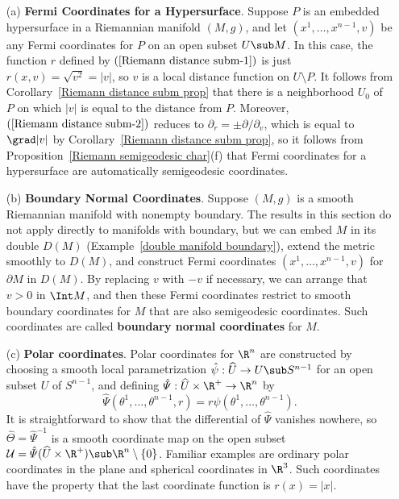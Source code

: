 \begin{example}
\mbox{}
\begin{itemize}
\item[(a)] \textbf{Fermi Coordinates for a Hypersurface}. Suppose $P$ is an embedded hypersurface in a Riemannian manifold $(M,g)$, and let $(x^1,\dots,x^{n-1},v)$ be 
any Fermi coordinates for $P$ on an open subset $U\sub M$. In this case, the function $r$ defined by $(\ref{Riemann distance subm-1})$ is just $r(x,v)=\sqrt{v^2}=|v|$, so 
$v$ is a local distance function on $U\setminus P$. It follows from Corollary~\ref{Riemann distance subm prop} that there is a neighborhood $U_0$ of $P$ on which $|v|$ 
is equal to the distance from $P$. Moreover, $(\ref{Riemann distance subm-2})$ reduces to $\partial_r=\pm\partial/\partial_v$, which is equal to $\grad |v|$ by 
Corollary~\ref{Riemann distance subm prop}, so it follows from Proposition~\ref{Riemann semigeodesic char}(f) that Fermi coordinates for a hypersurface are 
automatically semigeodesic coordinates.
\item[(b)] \textbf{Boundary Normal Coordinates}. Suppose $(M,g)$ is a smooth Riemannian manifold with nonempty boundary. The results in this section do not apply 
directly to manifolds with boundary, but we can embed $M$ in its double $D(M)$ (Example~\ref{double manifold boundary}), extend the metric smoothly to $D(M)$, 
and construct Fermi coordinates $(x^1,\dots,x^{n-1},v)$ for $\partial M$ in $D(M)$. By replacing $v$ with $-v$ if necessary, we can arrange that $v>0$ in $\Int M$, 
and then these Fermi coordinates restrict to smooth boundary coordinates for $M$ that are also semigeodesic coordinates. Such coordinates are called 
\textbf{boundary normal coordinates} for $M$.
\item[(c)] \textbf{Polar coordinates}. Polar coordinates for $\R^n$ are constructed by choosing a smooth local parametrization $\hat{\psi}:\widehat{U}\to U\sub S^{n-1}$ for an open subset $U$ of $S^{n-1}$, and defining $\hat{\varPsi}:\widehat{U}\times\R^+\to\R^n$ by 
\[\hat{\varPsi}(\theta^1,\dots,\theta^{n-1},r)=r\widehat{\psi}(\theta^1,\dots,\theta^{n-1}).\]
It is straightforward to show that the differential of $\hat{\varPsi}$ vanishes nowhere, so $\hat{\varTheta}=\hat{\varPsi}^{-1}$ is a smooth coordinate map on the open subset $\mathcal{U}=\hat{\varPsi}(\widehat{U}\times\R^+)\sub\R^n\setminus\{0\}$. Familiar examples are ordinary polar coordinates in the plane and spherical coordinates in $\R^3$. Such coordinates have the property that the last coordinate function is $r(x)=|x|$.

\end{itemize}
\end{example}
